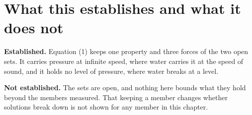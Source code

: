 \section{What this establishes and what it does not}

\textbf{Established.} Equation (1) keeps one property and three forces of the two open sets. It
carries pressure at infinite speed, where water carries it at the speed of sound, and it holds no
level of pressure, where water breaks at a level.

\textbf{Not established.} The sets are open, and nothing here bounds what they hold beyond the
members measured. That keeping a member changes whether solutions break down is not shown for any
member in this chapter.
